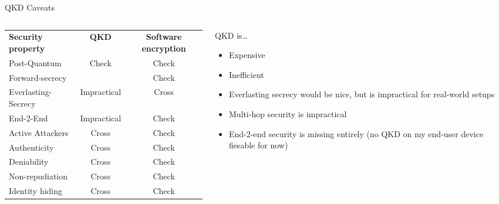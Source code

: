 \begin{frame}{QKD Caveats}
  \begin{columns}
    \begin{column}{.4\textwidth}

      \begin{tabular}{ l c c }
        \textbf{Security property} & \textbf{QKD} & \textbf{Software encryption} \\

        Post-Quantum        & Check           & Check           \\
        Forward-secrecy     &                 & Check           \\
        Everlasting-Secrecy & Impractical     & Cross           \\
        End-2-End           & Impractical     & Check           \\
        Active Attackers    & Cross           & Check           \\
        Authenticity        & Cross           & Check           \\
        Deniability         & Cross           & Check           \\
        Non-repudiation     & Cross           & Check           \\
        Identity hiding     & Cross           & Check           \\
      \end{tabular}
    \end{column}
    \begin{column}{.6\textwidth}
      QKD is…

      \begin{itemize}
        \item Expensive
        \item Inefficient
        \item Everlasting secrecy would be nice, but is impractical for real-world setups
        \item Multi-hop security is impractical
        \item End-2-end security is missing entirely (no QKD on my end-user device fiesable for now)
      \end{itemize}
    \end{column}
  \end{columns}
\end{frame}
